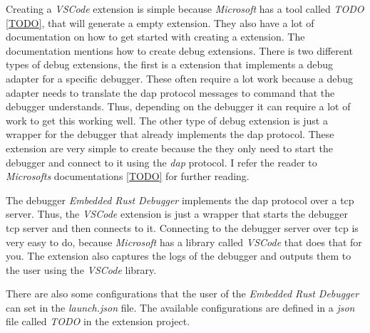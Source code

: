 Creating a \emph{VSCode} extension is simple because \emph{Microsoft} has a tool called \emph{TODO} \ref{TODO}, that will generate a empty extension.
They also have a lot of documentation on how to get started with creating a extension.
The documentation mentions how to create debug extensions.
There is two different types of debug extensions, the first is a extension that implements a debug adapter for a specific debugger.
These often require a lot work because a debug adapter needs to translate the \gls{dap} protocol messages to command that the debugger understands.
Thus, depending on the debugger it can require a lot of work to get this working well.
The other type of debug extension is just a wrapper for the debugger that already implements the \gls{dap} protocol.
These extension are very simple to create because the they only need to start the debugger and connect to it using the \emph{dap} protocol.
I refer the reader to \emph{Microsofts} documentations \ref{TODO} for further reading.

The debugger \emph{Embedded Rust Debugger} implements the \gls{dap} protocol over a \gls{tcp} server.
Thus, the \emph{VSCode} extension is just a wrapper that starts the debugger \gls{tcp} server and then connects to it.
Connecting to the debugger server over \gls{tcp} is very easy to do, because \emph{Microsoft} has a library called \emph{VSCode} that does that for you.
The extension also captures the logs of the debugger and outputs them to the user using the \emph{VSCode} library.

There are also some configurations that the user of the \emph{Embedded Rust Debugger} can set in the \emph{launch.json} file.
The available configurations are defined in a \emph{json} file called \emph{TODO} in the extension project.

